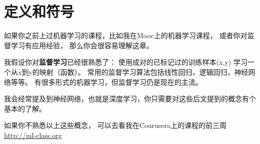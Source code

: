 \chapter{定义和符号}

\iffalse
If you have taken a machine learning course such as my machine learning MOOC on
Coursera, or if you have experience applying supervised learning, you will be able to
understand this text.
I assume you are familiar with supervised learning: Learning a function that maps from x
to y, using labeled training examples (x,y). Supervised learning algorithms include linear
regression, logistic regression, and neural networks. There are many forms of machine
learning, but the majority of machine learning’s practical value today is from supervised
learning.
I will frequently refer to neural networks (also known as “deep learning”). You’ll need only a
basic understanding of what they are to follow this text.
If you are not familiar with the concepts mentioned here, watch the first three weeks of
videos in the Machine Learning course on Coursera at http://ml-class.org
\fi

如果你之前上过机器学习的课程，比如我在Mooc上的机器学习课程，
或者你对监督学习有应用经验，
那么你会很容易理解这章。

我假设你对\textbf{监督学习}已经很熟悉了：
使用成对的已标记过的训练样本(x,y)
学习一个从x到y的映射（函数）。
常用的监督学习算法包括线性回归，逻辑回归，神经网络等等。
有很多形式的机器学习，但监督学习仍是现在的主流。

我会经常提及到神经网络，也就是深度学习，你只需要对这些后文提到的概念有个基本的了解。

如果你不熟悉以上这些概念，
可以去看我在Courusera上的课程的前三周
\url{http://ml-class.org}
